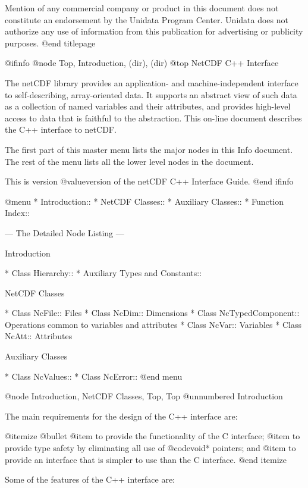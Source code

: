 Mention of any commercial company or product in this document 
does not constitute an endorsement by the Unidata Program Center.  
Unidata does not authorize any use of information from this 
publication for advertising or publicity purposes.
@end titlepage

@ifinfo
@node Top, Introduction, (dir), (dir)
@top NetCDF C++ Interface

The netCDF library provides an application- and
machine-independent interface to self-describing,
array-oriented data.  It supports an abstract view of such data as a
collection of named variables and their attributes, and provides
high-level access to data that is faithful to the abstraction.  This
on-line document describes the C++ interface to netCDF.

The first part of this master menu lists the major nodes in this Info
document.  The rest of the menu lists all the lower level nodes in the
document.

This is version @value{version} of the netCDF C++ Interface Guide.
@end ifinfo

@menu
* Introduction::                
* NetCDF Classes::              
* Auxiliary Classes::           
* Function Index::              

 --- The Detailed Node Listing ---

Introduction

* Class Hierarchy::             
* Auxiliary Types and Constants::  

NetCDF Classes

* Class NcFile::                Files
* Class NcDim::                 Dimensions
* Class NcTypedComponent::      Operations common to variables and attributes
* Class NcVar::                 Variables
* Class NcAtt::                 Attributes

Auxiliary Classes

* Class NcValues::              
* Class NcError::               
@end menu

@node Introduction, NetCDF Classes, Top, Top
@unnumbered Introduction

The main requirements for the design of the C++ interface are:

@itemize @bullet
@item
to provide the functionality of the C interface;
@item
to provide type safety by eliminating all use of @code{void*} pointers; and
@item
to provide an interface that is simpler to use than the C interface.
@end itemize

Some of the features of the C++ interface are:

